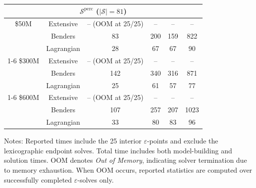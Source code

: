 \documentclass[preprint,11pt,authoryear]{elsarticle}
\begin{document}
\begin{table}[!t]
\begin{tabular}{cc|c|ccc}
\midrule
\multicolumn{6}{c}{\hspace{3em} $\mathcal{S}^{\text{perc}}$ ($|\mathcal{S}|=81$)} \\
\midrule
\$50M  & Extensive   &  -- (OOM at 25/25)  &  --  &  --  &  --  \\
       & Benders     &  83  &  200  &  159  &  822  \\
       & Lagrangian  &  28  &  67  &  67  &  90  \\
\cmidrule(lr){1-6}
\$300M & Extensive  &  -- (OOM at 25/25) &  --  &  --  &  --  \\
       & Benders     &  142  &  340  &  316  &  871  \\
       & Lagrangian  &  25  &  61  &  57  &  77  \\
\cmidrule(lr){1-6}
\$600M & Extensive   &  -- (OOM at 25/25) &  --  &  --  &  --  \\
       & Benders     &  107  &  257  &  207  &  1023  \\
       & Lagrangian  &  33  &  80  &  83  &  96  \\

\bottomrule
\end{tabular}

\vspace{2mm}

\begin{minipage}{\textwidth}
\footnotesize
Notes: Reported times include the 25 interior $\varepsilon$-points and exclude the 
lexicographic endpoint solves. Total time includes both model-building and solution times.
OOM denotes \emph{Out of Memory}, indicating solver termination due to memory exhaustion.
When OOM occurs, reported statistics are computed over successfully completed
$\varepsilon$-solves only.
\end{minipage}
\end{table}


\FloatBarrier




\end{document}
